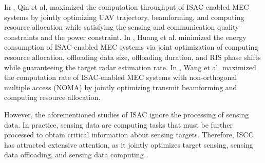 \documentclass[10pt,journal,compsoc]{IEEEtran}
\begin{document}
In \cite{Related works:ISAC-PRO:TVT:URLLC-Aware-Trajectory}, Qin et al. maximized the computation throughput of ISAC-enabled MEC systems by jointly optimizing UAV trajectory, beamforming, and computing resource allocation while satisfying the sensing and communication quality constraints and the power constraint.
In \cite{Related works:ISAC-PRO:WCL:Integrated-Sensing-And}, Huang et al. minimized the energy consumption of ISAC-enabled MEC systems via joint optimization of computing resource allocation, offloading data size, offloading duration, and RIS phase shifts while guaranteeing the target radar estimation rate. 
In \cite{Related works:ISAC-PRO:JSAC:NOMA-Aided-Joint}, Wang et al. maximized the computation rate of ISAC-enabled MEC systems with non-orthogonal multiple access (NOMA) by jointly optimizing transmit beamforming and computing resource allocation.

However, the aforementioned studies of ISAC ignore the processing of sensing data. 
In practice, sensing data are computing tasks that must be further processed to obtain critical information about sensing targets. 
Therefore, ISCC has attracted extensive attention, as it jointly optimizes target sensing, sensing data offloading, and sensing data computing
\cite{
Related works:ISCC:IoTJ:Unmanned-Aerial-Vehicle,
Related works:ISCC:TCCN:Collaborative-Optimization-Of,
Related works:ISCC:TCOM:Joint-Offloading-And,
Related works:ISCC:TGCN:Adaptive-Digital-Twin,
Related works:ISCC:TWC:Toward-Intelligent-Edge,
Related works:ISCC:TMC:Joint-Trajectory-And,
Related works:ISCC-PRO:WCL:Energy-Efficient-Integrated,
Related works:ISCC-PRO:TWC:Joint-Sensing-And}.
\end{document}
